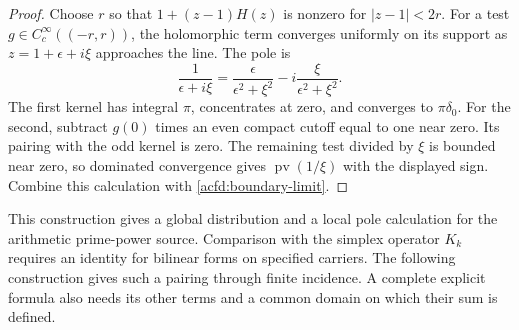 \begin{proof}
Choose $r$ so that $1+(z-1)H(z)$ is nonzero for $|z-1|<2r$.
For a test $g\in C_c^\infty((-r,r))$, the holomorphic term converges
uniformly on its support as $z=1+\epsilon+i\xi$ approaches the line.
The pole is
\[
 \frac1{\epsilon+i\xi}
   =\frac{\epsilon}{\epsilon^2+\xi^2}
       -i\frac{\xi}{\epsilon^2+\xi^2}.
\]
The first kernel has integral $\pi$, concentrates at zero, and converges
to $\pi\delta_0$.
For the second, subtract $g(0)$ times an even compact cutoff equal to one
near zero.  Its pairing with the odd kernel is zero.
The remaining test divided by $\xi$ is bounded near zero, so dominated
convergence gives $\operatorname{pv}(1/\xi)$ with the displayed sign.
Combine this calculation with \eqref{acfd:boundary-limit}.
\end{proof}

This construction gives a global distribution and a local pole calculation
for the arithmetic prime-power source.
Comparison with the simplex operator $K_k$ requires an identity for
bilinear forms on specified carriers.
The following construction gives such a pairing through finite incidence.
A complete explicit formula also needs its other terms and a common domain
on which their sum is defined.
